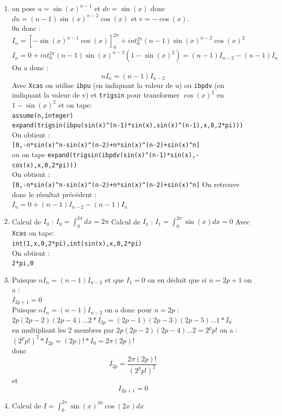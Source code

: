 \documentclass[a4paper,11pt]{book}
\begin{document}
\begin{enumerate}
\item on pose $u=\sin(x)^{n-1}$ et $dv=\sin(x)$ donc\\
$du=(n-1)\sin(x)^{n-2}\cos(x)$ et $v=-\cos(x)$.\\
0n donc :\\
$I_n=[-\sin(x)^{n-1}\cos(x)]_0^{2\pi}+int_0^{2\pi}(n-1)\sin(x)^{n-2}\cos(x)^2$\\
$I_n=0+int_0^{2\pi}(n-1)\sin(x)^{n-2}(1-\sin(x)^2)=(n-1)I_{n-2}-(n-1)I_n$
On a donc :
$$nI_n=(n-1)I_{n-2}$$
Avec {\tt Xcas} on utilise {\tt ibpu} (en indiquant la valeur de u) ou 
{\tt ibpdv} (en indiquant la valeur de v) et {\tt trigsin} pour 
transformer $\cos(x)^2$ en $1-\sin(x)^2$ et on tape:\\
{\tt assume(n,integer)}\\
{\tt expand(trigsin(ibpu(sin(x)\verb|^|(n-1)*sin(x),sin(x)\verb|^|(n-1),x,0,2*pi)))}
On obtient :\\
{\tt [0,-n*sin(x)\verb|^|n-sin(x)\verb|^|(n-2)+n*sin(x)\verb|^|(n-2)+sin(x)\verb|^|n]}\\
ou on tape
{\tt expand(trigsin(ibpdv(sin(x)\verb|^|(n-1)*sin(x),-cos(x),x,0,2*pi)))}\\
On obtient :\\
{\tt [0,-n*sin(x)\verb|^|n-sin(x)\verb|^|(n-2)+n*sin(x)\verb|^|(n-2)+sin(x)\verb|^|n]}
On retrouve donc le r\'esultat pr\'ec\'edent :\\
$I_n=0+(n-1)I_{n-2}-(n-1)I_n$
\item Calcul de $I_0$ :
$I_0=\int_0^{2\pi}dx=2\pi$
Calcul de $I_1$ :
$I_1=\int_0^{2\pi}\sin(x)dx=0$
Avec {\tt Xcas} on tape:\\
{\tt int(1,x,0,2*pi),int(sin(x),x,0,2*pi)}\\
On obtient :\\
{\tt 2*pi,0}
\item Puisque $nI_n=(n-1)I_{n-2}$ et que $I_1=0$ on en d\'eduit que si $n=2p+1$
on a :\\
$I_{2p+1}=0$\\
Puisque $nI_n=(n-1)I_{n-2}$ on a donc pour $n=2p$ :\\
$2p(2p-2)(2p-4)...2*I_{2p}=(2p-1)(2p-3)(2p-5)...1*I_0$\\
en multipliant les 2 membres par $2p(2p-2)(2p-4)...2=2^pp!$ on a :\\
$(2^pp!)^2*I_{2p}=(2p)!*I_0=2\pi(2p)!$\\
donc
$$I_{2p}=\frac{2\pi(2p)!}{(2^pp!)^2}$$
et
$$I_{2p+1}=0$$
\item Calcul de $I=\int_0^{2\pi}\sin(x)^{16}\cos(2x)dx$

\end{enumerate}
\end{document}
